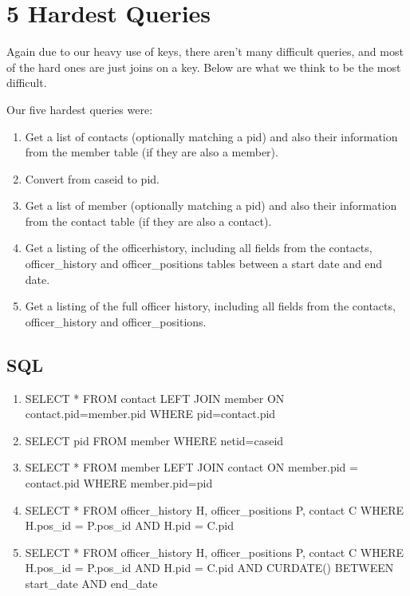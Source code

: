 \documentclass{article}
\begin{document}
\section{5 Hardest Queries}

Again due to our heavy use of keys, there aren't many difficult queries, and most of the hard ones are just joins on a key.  Below are what we think to be the most difficult.

Our five hardest queries were:\newline

\begin{enumerate}
\item Get a list of contacts (optionally matching a pid) and also their information from the member table (if they are also a member). 
\item Convert from caseid to pid. 
\item Get a list of member (optionally matching a pid) and also their information from the contact table (if they are also a contact). 
\item Get a listing of the officerhistory, including all fields from the contacts, officer\_history and officer\_positions tables between a start date and end date. 
\item Get a listing of the full officer history, including all fields from the contacts, officer\_history and officer\_positions. 
\end{enumerate}
\subsection{SQL}

\begin{enumerate}

\item SELECT * FROM contact LEFT JOIN member ON contact.pid=member.pid WHERE pid=contact.pid
\item SELECT pid FROM member WHERE netid=caseid
\item SELECT * FROM member LEFT JOIN contact ON member.pid = contact.pid WHERE member.pid=pid
\item SELECT * FROM officer\_history H, officer\_positions P, contact C WHERE H.pos\_id = P.pos\_id AND H.pid = C.pid
\item SELECT * FROM officer\_history H, officer\_positions P, contact C WHERE H.pos\_id = P.pos\_id AND H.pid = C.pid AND CURDATE() BETWEEN start\_date AND end\_date

\end{enumerate}
\end{document}
